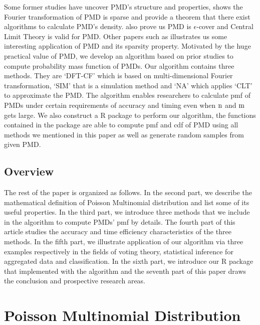 \documentclass[12pt]{article}
\newcommand{\PMD}{\textrm{PMD}}
\begin{document}


Some former studies have uncover $\PMD$'s structure and properties,  shows the Fourier transformation of $\PMD$ is sparse and provide a theorem that there exist algorithms to calculate PMD's density.  also prove us PMD is $\epsilon$-cover and Central Limit Theory is valid for PMD. Other papers such as  illustrates us some interesting application of PMD and its sparsity property. Motivated by the huge practical value of $\PMD$, we develop an algorithm based on prior studies to compute probability mass function of $\PMD$s. Our algorithm contains three methods. They are `DFT-CF' which is based on multi-dimensional Fourier transformation, `SIM' that is a simulation method and `NA' which applies `CLT' to approximate the $\PMD$. The algorithm enables researchers to calculate pmf of $\PMD$s under certain requirements of accuracy and timing even when $\rm n$ and $\rm m$ gets large. We also construct a R package to perform our algorithm, the functions contained in the package are able to compute pmf and cdf of $\PMD$ using all methods we mentioned in this paper as well as generate random samples from given $\PMD$.





\subsection{Overview}
The rest of the paper is organized as follows. In the second part, we describe the mathematical definition of Poisson Multinomial distribution and list some of its useful properties. In the third part, we introduce three methods that we include in the algorithm to compute $\PMD$s' pmf by details. The fourth part of this article studies the accuracy and time efficiency characteristics of the three methods. In the fifth part, we illustrate application of our algorithm via three examples respectively in the fields of voting theory, statistical inference for aggregated data and classification. In the sixth part, we introduce our R package that implemented with the algorithm and the seventh part of this paper draws the conclusion and prospective research areas.




\section{Poisson Multinomial Distribution}
\end{document}
